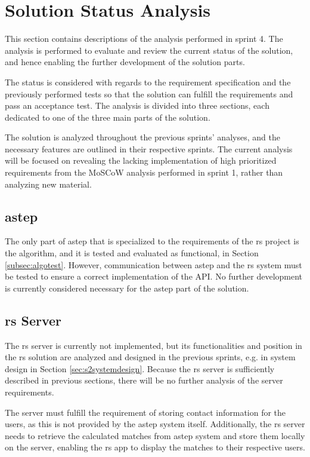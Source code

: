 \section{Solution Status Analysis}
This section contains descriptions of the analysis performed in sprint 4.
The analysis is performed to evaluate and review the current status of the solution, and hence enabling the further development of the solution parts.

The status is considered with regards to the requirement specification and the previously performed tests so that the solution can fulfill the requirements and pass an acceptance test.
The analysis is divided into three sections, each dedicated to one of the three main parts of the solution.

The solution is analyzed throughout the previous sprints' analyses, and the necessary features are outlined in their respective sprints.
The current analysis will be focused on revealing the lacking implementation of high prioritized requirements from the MoSCoW analysis performed in sprint 1, rather than analyzing new material.

\subsection{\gls{astep}}
The only part of \gls{astep} that is specialized to the requirements of the \gls{rs} project is the algorithm, and it is tested and evaluated as functional, in Section \ref{subsec:algotest}. 
However, communication between \gls{astep} and the \gls{rs} system must be tested to ensure a correct implementation of the API.
No further development is currently considered necessary for the \gls{astep} part of the solution.

\subsection{\gls{rs} Server}
The \gls{rs} server is currently not implemented, but its functionalities and position in the \gls{rs} solution are analyzed and designed in the previous sprints, e.g. in system design in Section \ref{sec:s2systemdesign}. Because the \gls{rs} server is sufficiently described in previous sections, there will be no further analysis of the server requirements.

The server must fulfill the requirement of storing contact information for the users, as this is not provided by the \gls{astep} system itself.
Additionally, the \gls{rs} server needs to retrieve the calculated matches from \gls{astep} system and store them locally on the server, enabling the \gls{rs} app to display the matches to their respective users.


